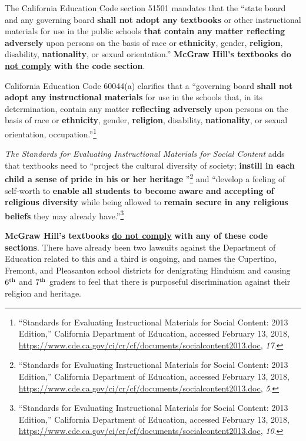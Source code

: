 The California Education Code section 51501 mandates that the “state board and any governing board \textbf{shall not adopt any textbooks} or other instructional materials for use in the public schools \textbf{that contain any matter reflecting adversely} upon persons on the basis of race or \textbf{ethnicity}, gender, \textbf{religion}, disability, \textbf{nationality}, or sexual orientation.” \textbf{McGraw Hill’s textbooks do} \underline{\textbf{not comply}} \textbf{with the code section}. 

California Education Code 60044(a) clarifies that a “governing board \textbf{shall not adopt any instructional materials} for use in the schools that, in its determination, contain any matter \textbf{reflecting adversely} upon persons on the basis of race or \textbf{ethnicity}, gender, \textbf{religion}, disability, \textbf{nationality}, or sexual orientation, occupation.”\footnote{“Standards for Evaluating Instructional Materials for Social Content: 2013 Edition,” California Department of Education, accessed February 13, 2018, \url{https://www.cde.ca.gov/ci/cr/cf/documents/socialcontent2013.doc}, \textit{17}.}

\textit{The Standards for Evaluating Instructional Materials for Social Content} adds that textbooks need to “project the cultural diversity of society; \textbf{instill in each child a sense of pride in his or her heritage} ”\footnote{“Standards for Evaluating Instructional Materials for Social Content: 2013 Edition,” California Department of Education, accessed February 13, 2018, \url{https://www.cde.ca.gov/ci/cr/cf/documents/socialcontent2013.doc}, \textit{5}.} and “develop a feeling of self-worth to \textbf{enable all students to become aware and accepting of religious diversity} while being allowed to \textbf{remain secure in any religious beliefs} they may already have.”\footnote{“Standards for Evaluating Instructional Materials for Social Content: 2013 Edition,” California Department of Education, accessed February 13, 2018, \url{https://www.cde.ca.gov/ci/cr/cf/documents/socialcontent2013.doc}, \textit{10}.}

\textbf{McGraw Hill’s textbooks} \underline{\textbf{do not comply}} \textbf{with any of these code sections}. There have already been two lawsuits against the Department of Education related to this and a third is ongoing, and names the Cupertino, Fremont, and Pleasanton school districts for denigrating Hinduism and causing $6^{\rm th}$ and $7^{\rm th}$ graders to feel that there is purposeful discrimination against their religion and heritage.


